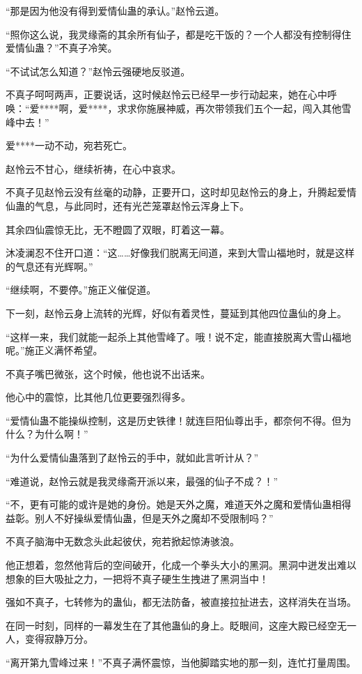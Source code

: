 \begin{this_body}
“那是因为他没有得到爱情仙蛊的承认。”赵怜云道。

“照你这么说，我灵缘斋的其余所有仙子，都是吃干饭的？一个人都没有控制得住爱情仙蛊？”不真子冷笑。

“不试试怎么知道？”赵怜云强硬地反驳道。

不真子呵呵两声，正要说话，这时候赵怜云已经早一步行动起来，她在心中呼唤：“爱****啊，爱****，求求你施展神威，再次带领我们五个一起，闯入其他雪峰中去！”

爱****一动不动，宛若死亡。

赵怜云不甘心，继续祈祷，在心中哀求。

不真子见赵怜云没有丝毫的动静，正要开口，这时却见赵怜云的身上，升腾起爱情仙蛊的气息，与此同时，还有光芒笼罩赵怜云浑身上下。

其余四仙震惊无比，无不瞪圆了双眼，盯着这一幕。

沐凌澜忍不住开口道：“这……好像我们脱离无间道，来到大雪山福地时，就是这样的气息还有光辉啊。”

“继续啊，不要停。”施正义催促道。

下一刻，赵怜云身上流转的光辉，好似有着灵性，蔓延到其他四位蛊仙的身上。

“这样一来，我们就能一起杀上其他雪峰了。哦！说不定，能直接脱离大雪山福地呢。”施正义满怀希望。

不真子嘴巴微张，这个时候，他也说不出话来。

他心中的震惊，比其他几位更要强烈得多。

“爱情仙蛊不能操纵控制，这是历史铁律！就连巨阳仙尊出手，都奈何不得。但为什么？为什么啊！”

“为什么爱情仙蛊落到了赵怜云的手中，就如此言听计从？”

“难道说，赵怜云就是我灵缘斋开派以来，最强的仙子不成？！”

“不，更有可能的或许是她的身份。她是天外之魔，难道天外之魔和爱情仙蛊相得益彰。别人不好操纵爱情仙蛊，但是天外之魔却不受限制吗？”

不真子脑海中无数念头此起彼伏，宛若掀起惊涛骇浪。

他正想着，忽然他背后的空间破开，化成一个拳头大小的黑洞。黑洞中迸发出难以想象的巨大吸扯之力，一把将不真子硬生生拽进了黑洞当中！

强如不真子，七转修为的蛊仙，都无法防备，被直接拉扯进去，这样消失在当场。

在同一时刻，同样的一幕发生在了其他蛊仙的身上。眨眼间，这座大殿已经空无一人，变得寂静万分。

“离开第九雪峰过来！”不真子满怀震惊，当他脚踏实地的那一刻，连忙打量周围。


\end{this_body}
